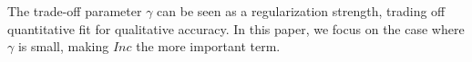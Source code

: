 \documentclass{article}
\theoremstyle{plain}
\theoremstyle{definition}
\theoremstyle{remark}
\newcommand\inco{\mathit{Inc}}
\numberwithin{equation}{section}
\begin{document}
	The trade-off parameter $\gamma$ can be seen as a regularization strength, trading off quantitative fit for qualitative accuracy. In this paper, we focus on the case where $\gamma$ is small, making $\inco$ the more important term.
	
\end{document}
